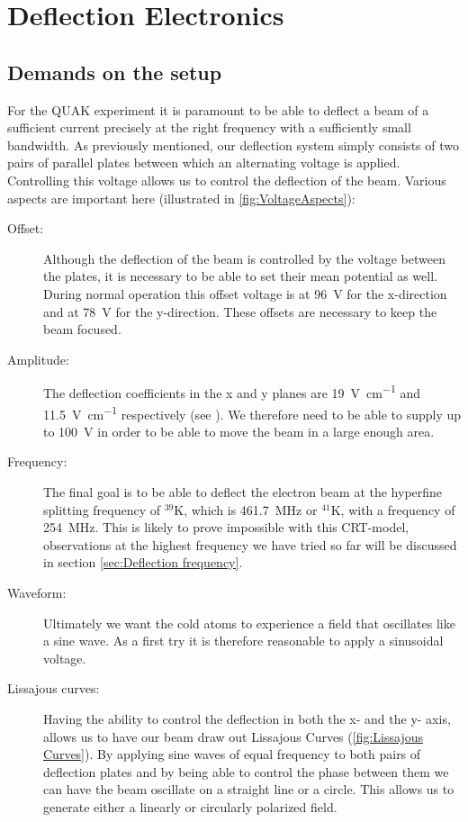 
\chapter{Deflection Electronics}

\section{Demands on the setup}

For the QUAK experiment it is paramount to be able to deflect a beam of a sufficient current precisely at the right frequency with a sufficiently small bandwidth. 
As previously mentioned, our deflection system simply consists of two pairs of parallel plates between which an alternating voltage is applied. Controlling this voltage allows us to control the deflection of the beam. Various aspects are important here (illustrated in \cref{fig:VoltageAspects}):

\begin{description}
	
	\item[Offset:] Although the deflection of the beam is controlled by the voltage between the plates, it is necessary to be able to set their mean potential as well. During normal operation this offset voltage is at \SI{96}{\volt} for the x-direction and at \SI{78}{\volt} for the y-direction. These offsets are necessary to keep the beam focused.
	\item[Amplitude:] The deflection coefficients in the x and y planes are \SI{19}{\volt\per\centi\meter} and \SI{11.5}{\volt\per\centi\meter} respectively (see \cite{D14363GY123-manual}). We therefore need to be able to supply up to \SI{100}{\volt} in order to be able to move the beam in a large enough area.
	\item[Frequency:] The final goal is to be able to deflect the electron beam at the hyperfine splitting frequency of $^{39}\mathrm{K}$, which is \SI{461.7}{\mega\hertz} or $^{41}\mathrm{K}$, with a frequency of \SI{254}{\mega\hertz}. This is likely to prove impossible with this CRT-model, observations at the highest frequency we have tried so far will be discussed in section \cref{sec:Deflection frequency}.
	\item[Waveform:] Ultimately we want the cold atoms to experience a field that oscillates like a sine wave. As a first try it is therefore reasonable to apply a sinusoidal voltage.
	\item[Lissajous curves:] Having the ability to control the deflection in both the x- and the y- axis, allows us to have our beam draw out Lissajous Curves (\cref{fig:Lissajous Curves}). By applying sine waves of equal frequency to both pairs of deflection plates and by being able to control the phase between them we can have the beam oscillate on a straight line or a circle. This allows us to generate either a linearly or circularly polarized field.
\end{description}

